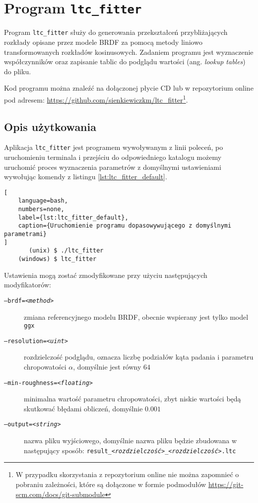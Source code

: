 \documentclass[../main.tex]{subfiles}
\begin{document}
\chapter{Program \texttt{ltc\_fitter}}
\label{appendix:ltc_fitter}

Program \texttt{ltc\_fitter} służy do generowania przekształceń przybliżających rozkłady opisane przez modele BRDF za pomocą metody liniowo transformowanych rozkładów kosinusowych. Zadaniem programu jest wyznaczenie współczynników oraz zapisanie tablic do podglądu wartości (ang. \textit{lookup tables}) do pliku.

Kod programu można znaleźć na dołączonej płycie CD lub w repozytorium online pod adresem: \url{https://github.com/sienkiewiczkm/ltc_fitter}\footnote{W przypadku skorzystania z repozytorium online nie można zapomnieć o pobraniu zależności, które są dołączone w formie podmodułów \url{https://git-scm.com/docs/git-submodule}}.

\section{Opis użytkowania}

Aplikacja \texttt{ltc\_fitter} jest programem wywoływanym z linii poleceń, po uruchomieniu terminala i przejściu do odpowiedniego katalogu możemy uruchomić proces wyznaczenia parametrów z domyślnymi ustawieniami wywołując komendy z listingu \ref{lst:ltc_fitter_default}.

\begin{lstlisting}[
    language=bash,
    numbers=none,
    label={lst:ltc_fitter_default},
    caption={Uruchomienie programu dopasowywującego z domyślnymi parametrami}
]
       (unix) $ ./ltc_fitter
    (windows) $ ltc_fitter
\end{lstlisting}

Ustawienia mogą zostać zmodyfikowane przy użyciu następujących modyfikatorów:
\begin{description}
    \item[\texttt{--brdf=\textit{<method>}}] zmiana referencyjnego modelu BRDF, obecnie wspierany jest tylko model \texttt{ggx}
    
    \item[\texttt{--resolution=\textit{<uint>}}] rozdzielczość podglądu, oznacza liczbę podziałów kąta padania i parametru chropowatości $\alpha$, domyślnie jest równy $64$
    
    \item[\texttt{--min-roughness=\textit{<floating>}}] minimalna wartość parametru chropowatości, zbyt niskie wartości będą skutkować błędami obliczeń, domyślnie $0.001$
    
    \item[\texttt{--output=\textit{<string>}}] nazwa pliku wyjściowego, domyślnie nazwa pliku będzie zbudowana w następujący sposób: \texttt{result\_\textit{<rozdzielczość>}\_\textit{<rozdzielczość>}.ltc}
\end{description}
\end{document}
